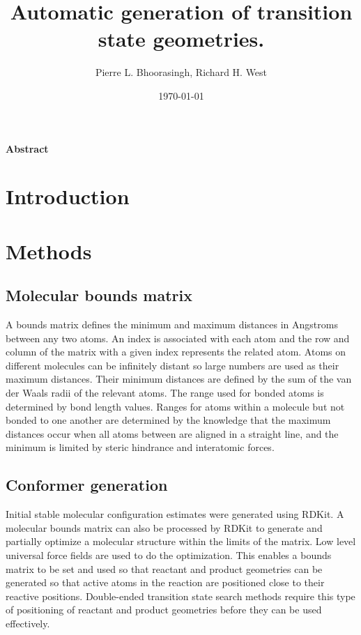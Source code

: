 \documentclass[11pt]{article}
\begin{document}
\title{Automatic generation of transition state geometries.}
\author{Pierre L. Bhoorasingh, Richard H. West}
\date{\today}
\maketitle

\newpage
\paragraph{Abstract}

\newpage
\section{Introduction}

\section{Methods}

\subsection{Molecular bounds matrix}
A bounds matrix defines the minimum and maximum distances in Angstroms between any two atoms. An index is associated with each atom and the row and column of the matrix with a given index represents the related atom. Atoms on different molecules can be infinitely distant so large numbers are used as their maximum distances. Their minimum distances are defined by the sum of the van der Waals radii of the relevant atoms. The range used for bonded atoms is determined by bond length values. Ranges for atoms within a molecule but not bonded to one another are determined by the knowledge that the maximum distances occur when all atoms between are aligned in a straight line, and the minimum is limited by steric hindrance and interatomic forces.

\subsection{Conformer generation}
Initial stable molecular configuration estimates were generated using RDKit. A molecular bounds matrix can also be processed by RDKit to generate and partially optimize a molecular structure within the limits of the matrix. Low level universal force fields are used to do the optimization. This enables a bounds matrix to be set and used so that reactant and product geometries can be generated so that active atoms in the reaction are positioned close to their reactive positions. Double-ended transition state search methods require this type of positioning of reactant and product geometries before they can be used effectively.
\end{document}
